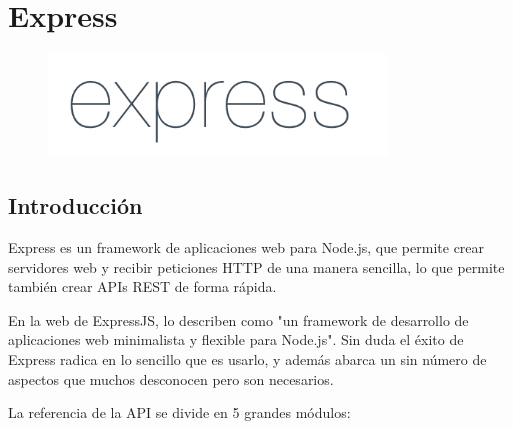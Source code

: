 \section{Express}

\begin{figure}[H]
    \centering
    \includegraphics[width=90mm]{memoria/LaTeX/img/infraestructura/express2.png}
\end{figure}

\subsection{Introducción}
Express es un framework de aplicaciones web para Node.js, que permite crear servidores web y recibir peticiones HTTP de una manera sencilla, lo que permite también crear APIs REST de forma rápida.

 En la web de ExpressJS, lo describen como "un framework de desarrollo de aplicaciones web minimalista y flexible para Node.js". Sin duda el éxito de Express radica en lo sencillo que es usarlo, y además abarca un sin número de aspectos que muchos desconocen pero son necesarios.

La referencia de la API se divide en 5 grandes módulos:


